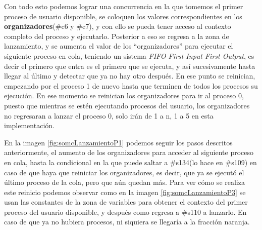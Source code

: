 \documentclass[letterpaper,12pt,oneside]{book}
\begin{document}
		
		Con todo esto podemos lograr una concurrencia en la que tomemos el primer proceso de usuario disponible, se coloquen los valores correspondientes en los
		\textbf{organizadores}(\#c6 y \#c7), y con ello se pueda tener acceso al contexto completo del proceso y ejecutarlo. Posterior a eso se regresa a la zona de lanzamiento,
		y se aumenta el valor de los ``organizadores'' para ejecutar el siguiente proceso en cola, teniendo un sistema \textit{FIFO First Input First Output}, 
		es decir el primero que entra es el primero que se ejecuta, y así sucesivamente hasta llegar al último y detectar que ya no hay otro después. En ese punto se reinician,
        empezando por el proceso 1 de nuevo hasta que terminen de todos los procesos su ejecución.
		En ese momento se reinician los organizadores para ir al proceso 0, puesto que mientras se estén ejecutando procesos del usuario, los organizadores
		no regresaran a lanzar el proceso 0, solo irán de 1 a n, 1 a 5 en esta implementación.

		
		En la imagen \ref{fig:somcLanzamientoP1} podemos seguir  los pasos descritos anteriormente,
        el aumento de los organizadores para acceder al siguiente proceso en cola,
    hasta la condicional en la que puede saltar a \#s134(lo hace en \#s109) en caso de que haya
		que reiniciar los organizadores, es decir, que ya se ejecutó el último proceso
        de la cola, pero que aún quedan más. Para ver cómo se realiza este reinicio podemos observar como en la imagen
		\ref{fig:somcLanzamientoP3} se usan las constantes de la zona de variables para obtener el contexto del primer proceso del usuario disponible, y después como
        regresa a \#s110 a lanzarlo. En caso de que ya no hubiera procesos, ni siquiera se llegaría a la fracción naranja.
		
		
\end{document}
